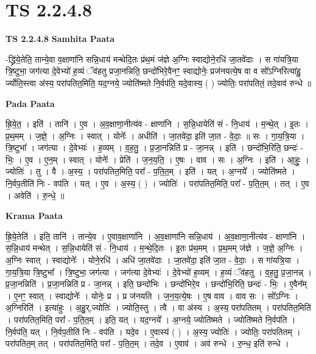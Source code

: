 \documentclass[17pt]{extarticle}
\begin{document}
\section*{ TS 2.2.4.8 }

\textbf{TS 2.2.4.8 } \newline
\textbf{Samhita Paata} \newline

-द्ध्रि॑ये॒तेति॒ तान्ये॒वा व॒क्षाणा॑नि सन्नि॒धाय॑ मन्थेदि॒तः प्र॑थ॒मं ज॑ज्ञे अ॒ग्निः स्वाद्योने॒रधि॑ जा॒तवे॑दाः । स गा॑यत्रि॒या त्रि॒ष्टुभा॒ जग॑त्या दे॒वेभ्यो॑ ह॒व्यं ॅव॑हतु प्रजा॒नन्निति॒ छन्दो॑भिरे॒वैनꣳ॒॒ स्वाद्योनेः॒ प्रज॑नयत्ये॒ष वा व सो᳚ऽग्निरित्या॑हु॒ र्ज्योति॒स्त्वा अ॑स्य॒ परा॑पतित॒मिति॒ यद॒ग्नये॒ ज्योति॑ष्मते नि॒र्वप॑ति॒ यदे॒वास्य॒ ( ) ज्योतिः॒ परा॑पतितं॒ तदे॒वाव॑ रुन्धे ॥ \newline

\textbf{Pada Paata} \newline

ह्रि॒ये॒त॒ । इति॑ । तानि॑ । ए॒व । अ॒व॒क्षाणा॒नीत्य॑व - क्षाणा॑नि । स॒न्नि॒धायेति॑ सं - नि॒धाय॑ । म॒न्थे॒त् । इ॒तः । प्र॒थ॒मम् । ज॒ज्ञे॒ । अ॒ग्निः । स्वात् । योनेः᳚ । अधीति॑ । जा॒तवे॑दा॒ इति॑ जा॒त - वे॒दाः॒ ॥ सः । गा॒य॒त्रि॒या । त्रि॒ष्टुभा᳚ । जग॑त्या । दे॒वेभ्यः॑ । ह॒व्यम् । व॒ह॒तु॒ । प्र॒जा॒नन्निति॑ प्र - जा॒नन्न् । इति॑ । छन्दो॑भि॒रिति॒ छन्दः॑ - भिः॒ । ए॒व । ए॒न॒म् । स्वात् । योनेः᳚ । प्रेति॑ । ज॒न॒य॒ति॒ । ए॒षः । वाव । सः । अ॒ग्निः । इति॑ । आ॒हुः॒ । ज्योतिः॑ । तु । वै । अ॒स्य॒ । परा॑पतित॒मिति॒ परा᳚ - प॒ति॒त॒म् । इति॑ । यत् । अ॒ग्नये᳚ । ज्योति॑ष्मते । नि॒र्वप॒तीति॑ निः - वप॑ति । यत् । ए॒व । अ॒स्य॒ ( ) । ज्योतिः॑ । परा॑पतित॒मिति॒ परा᳚ - प॒ति॒त॒म् । तत् । ए॒व । अवेति॑ । रु॒न्धे॒ ॥  \newline


\textbf{Krama Paata} \newline

ह्रि॒ये॒तेति॑ । इति॒ तानि॑ । तान्ये॒व । ए॒वाव॒क्षाणा॑नि । अ॒व॒क्षाणा॑नि सन्नि॒धाय॑ । अ॒व॒क्षाणा॒नीत्य॑व - क्षाणा॑नि । स॒न्नि॒धाय॑ मन्थेत् । स॒न्नि॒धायेति॑ सं - नि॒धाय॑ । म॒न्थे॒दि॒तः । इ॒तः प्र॑थ॒मम् । प्र॒थ॒मम् ज॑ज्ञे । ज॒ज्ञे॒ अ॒ग्निः । अ॒ग्निः स्वात् । स्वाद्योनेः᳚ । योने॒रधि॑ । अधि॑ जा॒तवे॑दाः । जा॒तवे॑दा॒ इति॑ जा॒त - वे॒दाः॒ । स गा॑यत्रि॒या । गा॒य॒त्रि॒या त्रि॒ष्टुभा᳚ । त्रि॒ष्टुभा॒ जग॑त्या । जग॑त्या दे॒वेभ्यः॑ । दे॒वेभ्यो॑ ह॒व्यम् । ह॒व्यं ॅव॑हतु । व॒ह॒तु॒ प्र॒जा॒नन्न् । प्र॒जा॒नन्निति॑ । प्र॒जा॒नन्निति॑ प्र - जा॒नन्न् । इति॒ छन्दो॑भिः । छन्दो॑भिरे॒व । छन्दो॑भि॒रिति॒ छन्दः॑ - भिः॒ । ए॒वैन᳚म् । ए॒नꣳ॒॒ स्वात् । स्वाद्योनेः᳚ । योनेः॒ प्र । प्र ज॑नयति । ज॒न॒य॒त्ये॒षः । ए॒ष वाव । वाव सः । सो᳚ऽग्निः । अ॒ग्निरिति॑ । इत्या॑हुः । अ॒हु॒र्,ज्योतिः॑ । ज्योति॒स्तु । त्वै । वा अ॑स्य । अ॒स्य॒ परा॑पतितम् । परा॑पतित॒मिति॑ । परा॑पतित॒मिति॒ परा᳚ - प॒ति॒त॒म् । इति॒ यत् । यद॒ग्नये᳚ । अ॒ग्नये॒ ज्योति॑ष्मते । ज्योति॑ष्मते नि॒र्वप॑ति । नि॒र्वप॑ति॒ यत् । नि॒र्वप॒तीति॑ निः - वप॑ति । यदे॒व । ए॒वास्य॑ ( ) । अ॒स्य॒ ज्योतिः॑ । ज्योतिः॒ परा॑पतितम् । परा॑पतित॒म् तत् । परा॑पतित॒मिति॒ परा᳚ - प॒ति॒त॒म् । तदे॒व । ए॒वाव॑ । अव॑ रुन्धे । रु॒न्ध॒ इति॑ रुन्धे । \newline
\end{document}

